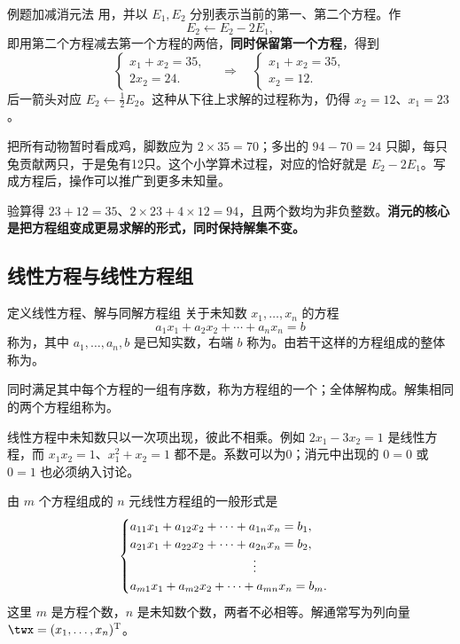 \documentclass[a4paper,12pt,twoside,openany,fontset=none]{ctexbook}
\newcounter{definition}[chapter]
\newenvironment{definition}[1][]{\begin{defBox}{定义}{#1}}{\end{defBox}}
\newcounter{example}[chapter]
\newenvironment{example}[1][]{\begin{exBox}{例题}{#1}}{\end{exBox}}
\numberwithin{equation}{chapter}
\begin{document}
\begin{example}[加减消元法]
用，并以 $E_1,E_2$ 分别表示当前的第一、第二个方程。作
\[
    E_2\leftarrow E_2-2E_1,
\]
即用第二个方程减去第一个方程的两倍，\textbf{同时保留第一个方程}，得到
\[
    \begin{cases}x_1+x_2=35,\\2x_2=24.\end{cases}
    \quad\Longrightarrow\quad
    \begin{cases}x_1+x_2=35,\\x_2=12.\end{cases}
\]
后一箭头对应 $E_2\leftarrow\tfrac12 E_2$。这种从下往上求解的过程称为，仍得 $x_2=12$、$x_1=23$。
\end{example}

把所有动物暂时看成鸡，脚数应为 $2\times35=70$；多出的 $94-70=24$ 只脚，每只兔贡献两只，于是兔有12只。这个小学算术过程，对应的恰好就是 $E_2-2E_1$。写成方程后，操作可以推广到更多未知量。

验算得 $23+12=35$、$2\times23+4\times12=94$，且两个数均为非负整数。\textbf{消元的核心是把方程组变成更易求解的形式，同时保持解集不变。}

\subsection*{线性方程与线性方程组}

\begin{definition}[线性方程、解与同解方程组]
关于未知数 $x_1,\ldots,x_n$ 的方程
\[
    a_1x_1+a_2x_2+\cdots+a_nx_n=b
\]
称为\textbf{}，其中 $a_1,\ldots,a_n,b$ 是已知实数，右端 $b$ 称为。由若干这样的方程组成的整体称为\textbf{}。

同时满足其中每个方程的一组有序数，称为方程组的一个\textbf{}；全体解构成\textbf{}。解集相同的两个方程组称为\textbf{}。
\end{definition}

线性方程中未知数只以一次项出现，彼此不相乘。例如 $2x_1-3x_2=1$ 是线性方程，而 $x_1x_2=1$、$x_1^2+x_2=1$ 都不是。系数可以为0；消元中出现的 $0=0$ 或 $0=1$ 也必须纳入讨论。

由 $m$ 个方程组成的 $n$ 元线性方程组的一般形式是
\begin{equation}
\label{eq:two-general-system}
\begin{cases}
 a_{11}x_1+a_{12}x_2+\cdots+a_{1n}x_n=b_1,\\
 a_{21}x_1+a_{22}x_2+\cdots+a_{2n}x_n=b_2,\\
 \hspace{35mm}\vdots\\
 a_{m1}x_1+a_{m2}x_2+\cdots+a_{mn}x_n=b_m.
\end{cases}
\end{equation}
这里 $m$ 是方程个数，$n$ 是未知数个数，两者不必相等。解通常写为列向量 $\twx=(x_1,\ldots,x_n)^{\mathrm T}$。
\end{document}
